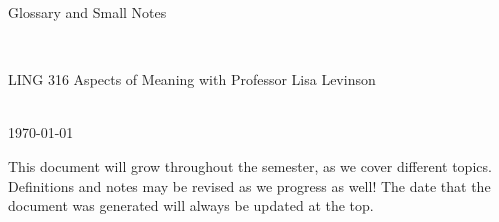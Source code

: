 \documentclass[12pt,letterpaper]{article}
\begin{document}
\begin{center}
\begin{Large}Glossary and Small Notes\end{Large}\\
\vspace{.2in}
\begin{large}LING 316 Aspects of Meaning with Professor Lisa Levinson\end{large}\\
\vspace{.2in}
\today
\end{center}

This document will grow throughout the semester, as we cover different topics. Definitions and notes may be revised as we progress as well! The date that the document was generated will always be updated at the top.



%





\setlength{\bibsep}{0ex}


\end{document}
